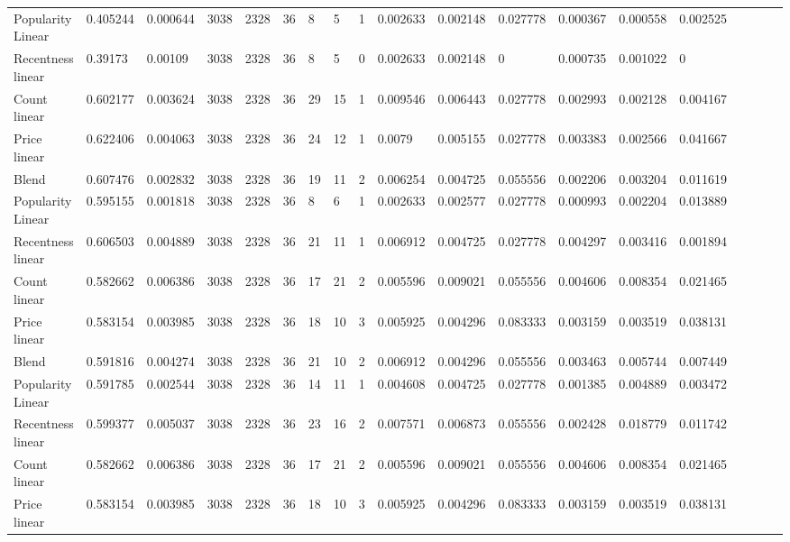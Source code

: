\begin{table}[H]
{\begin{tabular}{*{19}l}
Popularity Linear	&	0.405244 &	0.000644 &	3038 &	2328 &	36 &	8  &	5 &		1 &	0.002633 &	0.002148 &	0.027778 &	0.000367 &	0.000558 &	0.002525 &	 \\
Recentness linear	&	0.39173  &	0.00109 &	3038 &	2328 &	36 &	8  &	5 &		0 &	0.002633 &	0.002148 &	0 		 &	0.000735 &	0.001022 &	0 &	 \\
Count linear		&	0.602177 &	0.003624 &	3038 &	2328 &	36 &	29 &	15 &	1 &	0.009546 &	0.006443 &	0.027778 &	0.002993 &	0.002128 &	0.004167 &	 \\
Price linear		&	0.622406 &	0.004063 &	3038 &	2328 &	36 &	24 &	12 &	1 &	0.0079   &	0.005155 &	0.027778 &	0.003383 &	0.002566 &	0.041667 &	 \\
Blend				&	0.607476 &	0.002832 &	3038 &	2328 &	36 &	19 &	11 &	2 &	0.006254 &	0.004725 &	0.055556 &	0.002206 &	0.003204 &	0.011619 &	 \\
Popularity Linear	&	0.595155 &	0.001818 &	3038 &	2328 &	36 &	8  &	6  &	1 &	0.002633 &	0.002577 &	0.027778 &	0.000993 &	0.002204 &	0.013889 &	 \\
Recentness linear	&	0.606503 &	0.004889 &	3038 &	2328 &	36 &	21 &	11 &	1 &	0.006912 &	0.004725 &	0.027778 &	0.004297 &	0.003416 &	0.001894 &	 \\
Count linear		&	0.582662 &	0.006386 &	3038 &	2328 &	36 &	17 &	21 &	2 &	0.005596 &	0.009021 &	0.055556 &	0.004606 &	0.008354 &	0.021465 &	 \\
Price linear		&	0.583154 &	0.003985 &	3038 &	2328 &	36 &	18 &	10 &	3 &	0.005925 &	0.004296 &	0.083333 &	0.003159 &	0.003519 &	0.038131 &	 \\
Blend				&	0.591816 &	0.004274 &	3038 &	2328 &	36 &	21 &	10 &	2 &	0.006912 &	0.004296 &	0.055556 &	0.003463 &	0.005744 &	0.007449 &	 \\
Popularity Linear	&	0.591785 &	0.002544 &	3038 &	2328 &	36 &	14 &	11 &	1 &	0.004608 &	0.004725 &	0.027778 &	0.001385 &	0.004889 &	0.003472 &	 \\
Recentness linear	&	0.599377 &	0.005037 &	3038 &	2328 &	36 &	23 &	16 &	2 &	0.007571 &	0.006873 &	0.055556 &	0.002428 &	0.018779 &	0.011742 &	 \\
Count linear		&	0.582662 &	0.006386 &	3038 &	2328 &	36 &	17 &	21 &	2 &	0.005596 &	0.009021 &	0.055556 &	0.004606 &	0.008354 &	0.021465 &	 \\
Price linear		&	0.583154 &	0.003985 &	3038 &	2328 &	36 &	18 &	10 &	3 &	0.005925 &	0.004296 &	0.083333 &	0.003159 &	0.003519 &	0.038131 &	 \\

\end{tabular}}
\end{table}
